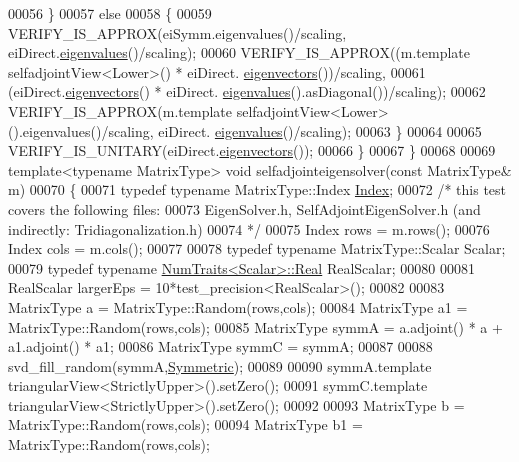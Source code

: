 \begin{DoxyCode}
00056     \}
00057     \textcolor{keywordflow}{else}
00058     \{
00059       VERIFY\_IS\_APPROX(eiSymm.eigenvalues()/scaling, eiDirect.\hyperlink{group___eigenvalues___module_a8efab27e82aa6aa0ae0c64739238c2e0}{eigenvalues}()/scaling);
00060       VERIFY\_IS\_APPROX((m.template selfadjointView<Lower>() * eiDirect.
      \hyperlink{group___eigenvalues___module_a7b9f7e641fa46ac4c5f2371405c69b2b}{eigenvectors}())/scaling,
00061                        (eiDirect.\hyperlink{group___eigenvalues___module_a7b9f7e641fa46ac4c5f2371405c69b2b}{eigenvectors}() * eiDirect.
      \hyperlink{group___eigenvalues___module_a8efab27e82aa6aa0ae0c64739238c2e0}{eigenvalues}().asDiagonal())/scaling);
00062       VERIFY\_IS\_APPROX(m.template selfadjointView<Lower>().eigenvalues()/scaling, eiDirect.
      \hyperlink{group___eigenvalues___module_a8efab27e82aa6aa0ae0c64739238c2e0}{eigenvalues}()/scaling);
00063     \}
00064 
00065     VERIFY\_IS\_UNITARY(eiDirect.\hyperlink{group___eigenvalues___module_a7b9f7e641fa46ac4c5f2371405c69b2b}{eigenvectors}());
00066   \}
00067 \}
00068 
00069 \textcolor{keyword}{template}<\textcolor{keyword}{typename} MatrixType> \textcolor{keywordtype}{void} selfadjointeigensolver(\textcolor{keyword}{const} MatrixType& m)
00070 \{
00071   \textcolor{keyword}{typedef} \textcolor{keyword}{typename} MatrixType::Index \hyperlink{namespace_eigen_a62e77e0933482dafde8fe197d9a2cfde}{Index};
00072   \textcolor{comment}{/* this test covers the following files:}
00073 \textcolor{comment}{     EigenSolver.h, SelfAdjointEigenSolver.h (and indirectly: Tridiagonalization.h)}
00074 \textcolor{comment}{  */}
00075   Index rows = m.rows();
00076   Index cols = m.cols();
00077 
00078   \textcolor{keyword}{typedef} \textcolor{keyword}{typename} MatrixType::Scalar Scalar;
00079   \textcolor{keyword}{typedef} \textcolor{keyword}{typename} \hyperlink{group___core___module_struct_eigen_1_1_num_traits}{NumTraits<Scalar>::Real} RealScalar;
00080 
00081   RealScalar largerEps = 10*test\_precision<RealScalar>();
00082 
00083   MatrixType a = MatrixType::Random(rows,cols);
00084   MatrixType a1 = MatrixType::Random(rows,cols);
00085   MatrixType symmA =  a.adjoint() * a + a1.adjoint() * a1;
00086   MatrixType symmC = symmA;
00087   
00088   svd\_fill\_random(symmA,\hyperlink{group__enums_gga39e3366ff5554d731e7dc8bb642f83cda7d30fb969ef6b763c098f0015108cef4}{Symmetric});
00089 
00090   symmA.template triangularView<StrictlyUpper>().setZero();
00091   symmC.template triangularView<StrictlyUpper>().setZero();
00092 
00093   MatrixType b = MatrixType::Random(rows,cols);
00094   MatrixType b1 = MatrixType::Random(rows,cols);

\end{DoxyCode}

